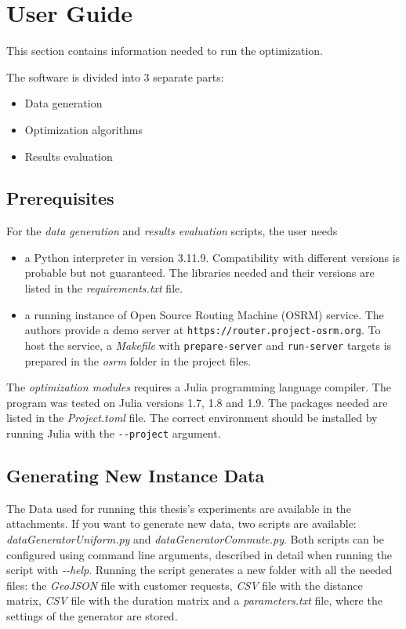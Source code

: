 \chapter{User Guide}\label{app:user}

This section contains information needed to run the optimization.

The software is divided into 3 separate parts:

\begin{itemize}
    \setlength\itemsep{0pt}
    \item Data generation
    \item Optimization algorithms
    \item Results evaluation
\end{itemize}

\section{Prerequisites}

For the \textit{data generation} and \textit{results evaluation} scripts, the user needs
\begin{itemize}
    \setlength\itemsep{0pt}
    \item a Python interpreter in version 3.11.9. Compatibility with different versions is probable but not guaranteed. The libraries needed and their versions are listed in the \textit{requirements.txt} file. 
    \item a running instance of Open Source Routing Machine (OSRM) \cite{luxen-vetter-2011} service. The authors provide a demo server at \texttt{https://router.project-osrm.org}. To host the service, a \textit{Makefile} with \texttt{prepare-server} and \texttt{run-server} targets is prepared in the \textit{osrm} folder in the project files.
\end{itemize}

The \textit{optimization modules} requires a Julia programming language compiler. The program was tested on Julia versions 1.7, 1.8 and 1.9. The packages needed are listed in the \textit{Project.toml} file. The correct environment should be installed by running Julia with the \texttt{-{}-project} argument.

\section{Generating New Instance Data}

The Data used for running this thesis's experiments are available in the attachments. If you want to generate new data, two scripts are available: \textit{dataGeneratorUniform.py} and \textit{dataGeneratorCommute.py}. Both scripts can be configured using command line arguments, described in detail when running the script with \textit{-{}-help}. Running the script generates a new folder with all the needed files: the \textit{GeoJSON} file with customer requests, \textit{CSV} file with the distance matrix, \textit{CSV} file with the duration matrix and a \textit{parameters.txt} file, where the settings of the generator are stored.

